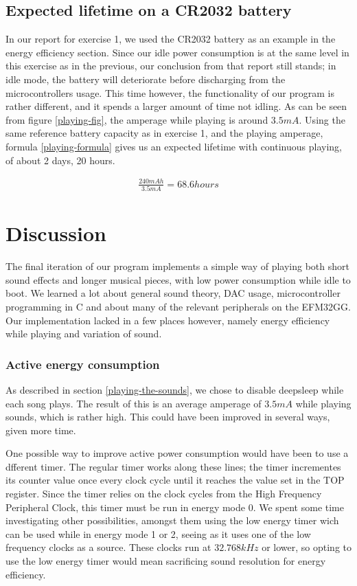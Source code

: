 \subsection{Expected lifetime on a CR2032 battery}

In our report for exercise 1, we used the CR2032 battery as an example in the energy efficiency section. \cite[p.~13]{exercise1report} Since our idle power consumption is at the same level in this exercise as in the previous, our conclusion from that report still stands; in idle mode, the battery will deteriorate before discharging from the microcontrollers usage. This time however, the functionality of our program is rather different, and it spends a larger amount of time not idling. As can be seen from figure \ref{playing-fig}, the amperage while playing is around $3.5mA$. Using the same reference battery capacity \cite{cr2032} as in exercise 1, and the playing amperage, formula \ref{playing-formula} gives us an expected lifetime with continuous playing, of about 2 days, 20 hours.

\begin{gather}
\label{playing-formula}
\frac{240mAh}{3.5mA} = 68.6 hours
\end{gather}

\section{Discussion}

The final iteration of our program implements a simple way of playing both short sound effects and longer musical pieces, with low power consumption while idle to boot. We learned a lot about general sound theory, DAC usage, microcontroller programming in C and about many of the relevant peripherals on the EFM32GG. Our implementation lacked in a few places however, namely energy efficiency while playing and variation of sound.

\subsubsection{Active energy consumption}

As described in section \ref{playing-the-sounds}, we chose to disable deepsleep while each song plays. The result of this is an average amperage of $3.5mA$ while playing sounds, which is rather high. This could have been improved in several ways, given more time.

One possible way to improve active power consumption would have been to use a dfferent timer. The regular timer works along these lines; the timer incrementes its counter value once every clock cycle until it reaches the value set in the TOP register. Since the timer relies on the clock cycles from the High Frequency Peripheral Clock, this timer must be run in energy mode 0. We spent some time investigating other possibilities, amongst them using the low energy timer wich can be used while in energy mode 1 or 2, seeing as it uses one of the low frequency clocks as a source. These clocks run at $32.768 kHz$ or lower, so opting to use the low energy timer would mean sacrificing sound resolution for energy efficiency.

